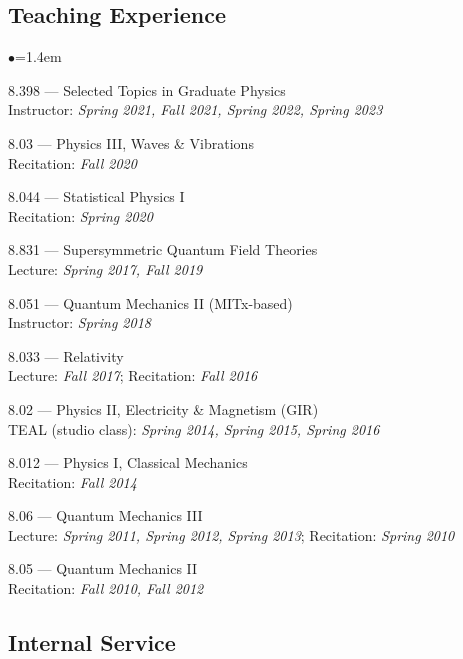 \documentclass[11pt]{article}
\newcommand{\heading}[1]{\vspace{0in}\subsection*{#1} \vspace{.02in}}
\newcommand{\sh}{\phantom{.....}}
\newcommand{\bbl}{\begin{list}{$\bullet$}{\leftmargin=1.4em \itemsep=-1pt}}
\newcommand{\el}{\end{list}}
\begin{document}

\heading{Teaching Experience}

\bbl
\item 8.398 --- Selected Topics in Graduate Physics
\\ \sh Instructor:  \textit{Spring 2021, Fall 2021, Spring 2022, Spring 2023}
\item 8.03 --- Physics III, Waves \& Vibrations
\\ \sh Recitation:  \textit{Fall 2020}
\item 8.044 --- Statistical Physics I
\\ \sh Recitation:  \textit{Spring 2020}
\item 8.831 --- Supersymmetric Quantum Field Theories
\\ \sh Lecture:  \textit{Spring 2017, Fall 2019}
\item 8.051 --- Quantum Mechanics II (MITx-based)
\\ \sh Instructor: \textit{Spring 2018}
\item 8.033 --- Relativity
\\ \sh Lecture:  \textit{Fall 2017}; Recitation:  \textit{Fall 2016}
\item 8.02 --- Physics II, Electricity \& Magnetism (GIR)
\\ \sh TEAL (studio class): \textit{Spring 2014, Spring 2015, Spring 2016}
\item 8.012 --- Physics I, Classical Mechanics
\\ \sh Recitation:  \textit{Fall 2014}
\item 8.06 --- Quantum Mechanics III
\\ \sh Lecture: \textit{Spring 2011, Spring 2012, Spring 2013}; Recitation: \textit{Spring 2010}
\item 8.05 --- Quantum Mechanics II
\\ \sh Recitation:  \textit{Fall 2010, Fall 2012}
\el


\heading{Internal Service}
\end{document}
